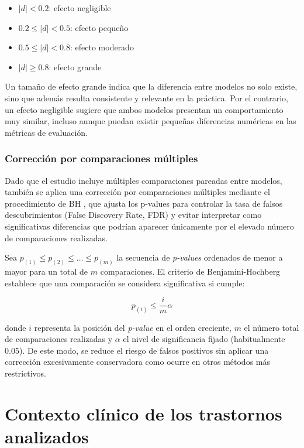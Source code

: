 \begin{itemize}
	\item \(|d| < 0.2\): efecto negligible
	\item \(0.2 \leq |d| < 0.5\): efecto pequeño
	\item \(0.5 \leq |d| < 0.8\): efecto moderado
	\item \(|d| \geq 0.8\): efecto grande
\end{itemize}

Un tamaño de efecto grande indica que la diferencia entre modelos no solo existe, sino que además resulta consistente y relevante en la práctica. Por el contrario, un efecto negligible sugiere que ambos modelos presentan un comportamiento muy similar, incluso aunque puedan existir pequeñas diferencias numéricas en las métricas de evaluación.

\subsubsection{Corrección por comparaciones múltiples}

Dado que el estudio incluye múltiples comparaciones pareadas entre modelos, también se aplica una corrección por comparaciones múltiples mediante el procedimiento de \ac{BH} \cite{benjamini_controlling_1995}, que ajusta los p-values para controlar la tasa de falsos descubrimientos (False Discovery Rate, FDR) y evitar interpretar como significativas diferencias que podrían aparecer únicamente por el elevado número de comparaciones realizadas.

Sea \(p_{(1)} \leq p_{(2)} \leq \dots \leq p_{(m)}\) la secuencia de \textit{p-values} ordenados de menor a mayor para un total de \(m\) comparaciones. El criterio de Benjamini-Hochberg establece que una comparación se considera significativa si cumple:

\[
p_{(i)} \leq \frac{i}{m}\alpha
\]

donde \(i\) representa la posición del \textit{p-value} en el orden creciente, \(m\) el número total de comparaciones  realizadas y \(\alpha\) el nivel de significancia fijado (habitualmente 0.05). De este modo, se reduce el riesgo de falsos positivos sin aplicar una corrección excesivamente conservadora como ocurre en otros métodos más restrictivos.

\newpage

\section{Contexto clínico de los trastornos analizados}

